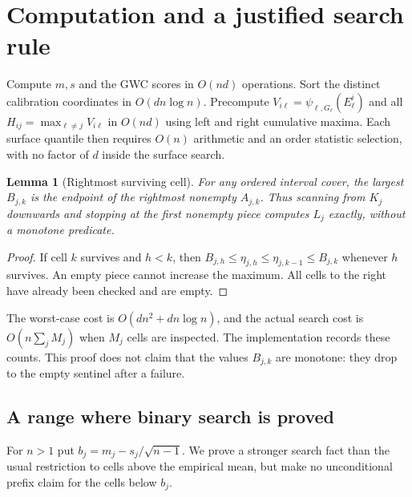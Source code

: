 \documentclass[11pt]{article}
\newtheorem{lemma}[theorem]{Lemma}
\begin{document}
\section{Computation and a justified search rule}
Compute $m,s$ and the GWC scores in $O(nd)$ operations. Sort the distinct
calibration coordinates in $O(dn\log n)$. Precompute
$V_{i\ell}=\psi_{\ell,G_\ell}(E^i_\ell)$ and all
$H_{ij}=\max_{\ell\ne j}V_{i\ell}$ in $O(nd)$ using left and right cumulative
maxima. Each surface quantile then requires $O(n)$ arithmetic and an order
statistic selection, with no factor of $d$ inside the surface search.

\begin{lemma}[Rightmost surviving cell]\label{lem:backward}
For any ordered interval cover, the largest $B_{j,k}$ is the endpoint of the
rightmost nonempty $A_{j,k}$. Thus scanning from $K_j$ downwards and stopping at
the first nonempty piece computes $L_j$ exactly, without a monotone predicate.
\end{lemma}
\begin{proof}
If cell $k$ survives and $h<k$, then
$B_{j,h}\le\eta_{j,h}\le\eta_{j,k-1}\le B_{j,k}$ whenever $h$ survives.
An empty piece cannot increase the maximum. All cells to the right have already
been checked and are empty.
\end{proof}
The worst-case cost is $O(dn^2+dn\log n)$, and the actual search cost is
$O(n\sum_j M_j)$ when $M_j$ cells are inspected. The implementation records
these counts. This proof does not claim that the values $B_{j,k}$ are monotone:
they drop to the empty sentinel after a failure.

\subsection{A range where binary search is proved}\label{sec:binary}
For $n>1$ put $b_j=m_j-s_j/\sqrt{n-1}$. We prove a stronger search fact than
the usual restriction to cells above the empirical mean, but make no
unconditional prefix claim for the cells below $b_j$.
\end{document}
